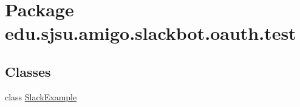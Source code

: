\hypertarget{namespaceedu_1_1sjsu_1_1amigo_1_1slackbot_1_1oauth_1_1test}{}\section{Package edu.\+sjsu.\+amigo.\+slackbot.\+oauth.\+test}
\label{namespaceedu_1_1sjsu_1_1amigo_1_1slackbot_1_1oauth_1_1test}
\subsection*{Classes}
\begin{DoxyCompactItemize}
\item 
class \hyperlink{classedu_1_1sjsu_1_1amigo_1_1slackbot_1_1oauth_1_1test_1_1_slack_example}{Slack\+Example}
\end{DoxyCompactItemize}
